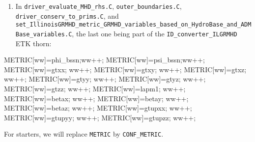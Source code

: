 \documentclass[landscape,letterpaper,10pt,english]{article}
\providecommand{\tightlist}{%
      \setlength{\itemsep}{0pt}\setlength{\parskip}{0pt}}
\newenvironment{Shaded}{}{}
\newcommand{\NormalTok}[1]{{#1}}
\begin{document}
\begin{enumerate}
\def\labelenumi{\arabic{enumi}.}
\setcounter{enumi}{1}
\tightlist
\item
  In \texttt{driver\_evaluate\_MHD\_rhs.C},
  \texttt{outer\_boundaries.C}, \texttt{driver\_conserv\_to\_prims.C},
  and
  \texttt{set\_IllinoisGRMHD\_metric\_GRMHD\_variables\_based\_on\_HydroBase\_and\_ADMBase\_variables.C},
  the last one being part of the \texttt{ID\_converter\_ILGRMHD} ETK
  thorn:
\end{enumerate}

\begin{Shaded}
\begin{Highlighting}[]
\NormalTok{  METRIC[ww]=phi_bssn;ww++;}
\NormalTok{  METRIC[ww]=psi_bssn;ww++;}
\NormalTok{  METRIC[ww]=gtxx;    ww++;}
\NormalTok{  METRIC[ww]=gtxy;    ww++;}
\NormalTok{  METRIC[ww]=gtxz;    ww++;}
\NormalTok{  METRIC[ww]=gtyy;    ww++;}
\NormalTok{  METRIC[ww]=gtyz;    ww++;}
\NormalTok{  METRIC[ww]=gtzz;    ww++;}
\NormalTok{  METRIC[ww]=lapm1;   ww++;}
\NormalTok{  METRIC[ww]=betax;   ww++;}
\NormalTok{  METRIC[ww]=betay;   ww++;}
\NormalTok{  METRIC[ww]=betaz;   ww++;}
\NormalTok{  METRIC[ww]=gtupxx;  ww++;}
\NormalTok{  METRIC[ww]=gtupyy;  ww++;}
\NormalTok{  METRIC[ww]=gtupzz;  ww++;}
\end{Highlighting}
\end{Shaded}

For starters, we will replace \texttt{METRIC} by \texttt{CONF\_METRIC}.
\end{document}
